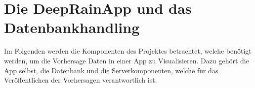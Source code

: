 \section{Die DeepRainApp und das Datenbankhandling}\label{die deeprain app und das datenbankhandling}  
Im Folgenden werden die Komponenten des Projektes betrachtet, welche benötigt werden, um die Vorhersage Daten in einer 
App zu Visualisieren.
Dazu gehört die App selbst, die Datenbank und die Serverkomponenten, welche für das Veröffentlichen der Vorhersagen 
verantwortlich ist.





